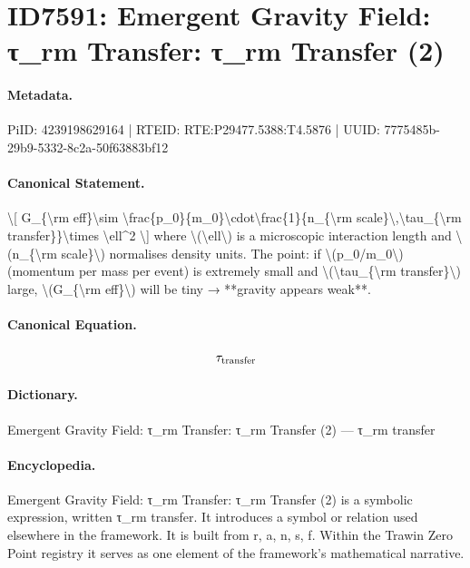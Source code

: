 \section*{ID7591: Emergent Gravity Field: τ\_rm Transfer: τ\_rm Transfer (2)}
\paragraph{Metadata.}
PiID: 4239198629164 | RTEID: RTE:P29477.5388:T4.5876 | UUID: 7775485b-29b9-5332-8c2a-50f63883bf12

\paragraph{Canonical Statement.}
\textbackslash{}[ G\_\{\textbackslash{}rm eff\}\textbackslash{}sim \textbackslash{}frac\{p\_0\}\{m\_0\}\textbackslash{}cdot\textbackslash{}frac\{1\}\{n\_\{\textbackslash{}rm scale\}\textbackslash{},\textbackslash{}tau\_\{\textbackslash{}rm transfer\}\}\textbackslash{}times \textbackslash{}ell\textasciicircum{}2 \textbackslash{}] where \textbackslash{}(\textbackslash{}ell\textbackslash{}) is a microscopic interaction length and \textbackslash{}(n\_\{\textbackslash{}rm scale\}\textbackslash{}) normalises density units. The point: if \textbackslash{}(p\_0/m\_0\textbackslash{}) (momentum per mass per event) is extremely small and \textbackslash{}(\textbackslash{}tau\_\{\textbackslash{}rm transfer\}\textbackslash{}) large, \textbackslash{}(G\_\{\textbackslash{}rm eff\}\textbackslash{}) will be tiny → **gravity appears weak**.

\paragraph{Canonical Equation.}
\[
\tau_{\rm transfer}
\]

\paragraph{Dictionary.}
Emergent Gravity Field: τ\_rm Transfer: τ\_rm Transfer (2) — τ\_rm transfer

\paragraph{Encyclopedia.}
Emergent Gravity Field: τ\_rm Transfer: τ\_rm Transfer (2) is a symbolic expression, written τ\_rm transfer. It introduces a symbol or relation used elsewhere in the framework. It is built from r, a, n, s, f. Within the Trawin Zero Point registry it serves as one element of the framework's mathematical narrative.
